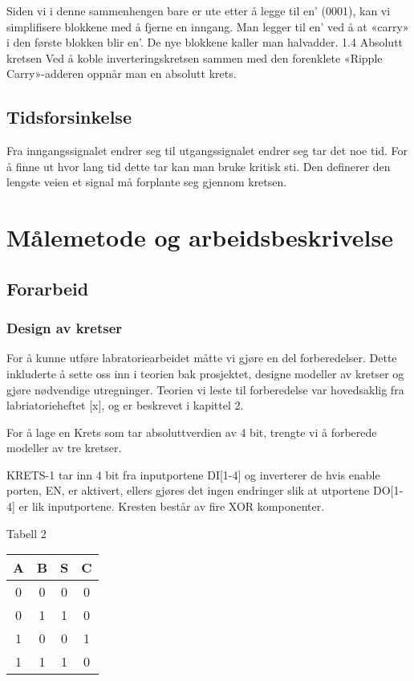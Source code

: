 \documentclass{article}
\begin{document}
Siden vi i denne sammenhengen bare er ute etter å legge til en’ (0001), kan vi simplifisere blokkene med å fjerne en inngang. Man legger til en’ ved å at «carry» i den første blokken blir en’. De nye blokkene kaller man halvadder.
1.4 Absolutt kretsen
Ved å koble inverteringskretsen sammen med den forenklete «Ripple Carry»-adderen oppnår man en absolutt krets.

\subsection{Tidsforsinkelse}
Fra inngangssignalet endrer seg til utgangssignalet endrer seg tar det noe tid. For å finne ut hvor lang tid dette tar kan man bruke kritisk sti. Den definerer den lengste veien et signal må forplante seg gjennom kretsen.

\section{Målemetode og arbeidsbeskrivelse}

\subsection{Forarbeid}
\subsubsection{Design av kretser}
For å kunne utføre labratoriearbeidet måtte vi gjøre en del forberedelser. Dette inkluderte å sette oss inn i teorien bak prosjektet, designe modeller av kretser og gjøre nødvendige utregninger. Teorien vi leste til forberedelse var hovedsaklig fra labriatorieheftet [x], og er beskrevet i kapittel 2.

For å lage en Krets som tar absoluttverdien av 4 bit, trengte vi å forberede modeller av tre kretser.

KRETS-1 tar inn 4 bit fra inputportene DI[1-4] og inverterer de hvis enable porten, EN, er aktivert, ellers gjøres det ingen endringer slik at utportene DO[1-4] er lik inputportene. Kresten består av fire XOR komponenter.

\begin{center}
	Tabell 2
\end{center}
\begin{center}
	\begin{tabular} {| c | c | c | c |} \hline
		A & B & S & C \\ \hline
		0 & 0 & 0 & 0 \\ \hline
		0 & 1 & 1 & 0 \\ \hline
		1 & 0 & 0 & 1 \\ \hline
		1 & 1 & 1 & 0 \\ \hline
	\end{tabular}
\end{center}
\end{document}
